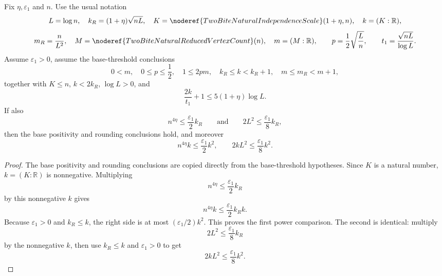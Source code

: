 \begin{helper}
Fix \(\eta,\varepsilon_1\) and \(n\).  Use the usual notation
\[
L=\log n,\quad
k_R=(1+\eta)\sqrt{nL},\quad
K=\noderef{TwoBiteNaturalIndependenceScale}(1+\eta,n),\quad k=(K:\mathbb R),
\]
\[
m_R=\frac n{L^2},\quad
M=\noderef{TwoBiteNaturalReducedVertexCount}(n),\quad m=(M:\mathbb R),
\qquad
p=\frac12\sqrt{\frac Ln},\qquad
t_1=\frac{\sqrt{nL}}{\log L}.
\]
Assume \(\varepsilon_1>0\), assume the base-threshold conclusions
\[
0<m,\quad 0\le p\le\frac12,\quad 1\le2pm,\quad
k_R\le k<k_R+1,\quad m\le m_R<m+1,
\]
together with \(K\le n\), \(k<2k_R\), \(\log L>0\), and
\[
\frac{2k}{t_1}+1\le5(1+\eta)\log L.
\]
If also
\[
n^{4\eta}\le\frac{\varepsilon_1}{2}k_R
\qquad\text{and}\qquad
2L^2\le\frac{\varepsilon_1}{8}k_R,
\]
then the base positivity and rounding conclusions hold, and moreover
\[
n^{4\eta}k\le\frac{\varepsilon_1}{2}k^2,\qquad
2kL^2\le\frac{\varepsilon_1}{8}k^2.
\]
\end{helper}
\begin{proof}
The base positivity and rounding conclusions are copied directly from the
base-threshold hypotheses.  Since \(K\) is a natural number, \(k=(K:\mathbb R)\)
is nonnegative.  Multiplying
\[
n^{4\eta}\le\frac{\varepsilon_1}{2}k_R
\]
by this nonnegative \(k\) gives
\[
n^{4\eta}k\le\frac{\varepsilon_1}{2}k_Rk.
\]
Because \(\varepsilon_1>0\) and \(k_R\le k\), the right side is at most
\((\varepsilon_1/2)k^2\).  This proves the first power comparison.  The second
is identical: multiply
\[
2L^2\le\frac{\varepsilon_1}{8}k_R
\]
by the nonnegative \(k\), then use \(k_R\le k\) and \(\varepsilon_1>0\) to get
\[
2kL^2\le\frac{\varepsilon_1}{8}k^2.
\]
\end{proof}

